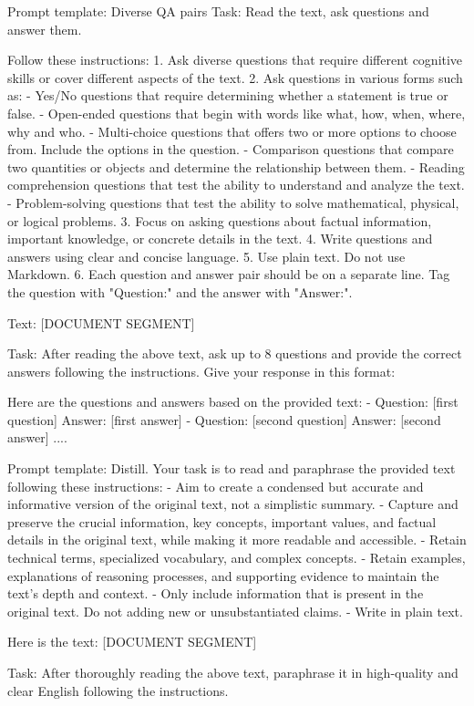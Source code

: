 \documentclass[11pt]{article}
\begin{document}
\begin{table}[!hbt]
\begin{prompt}{Prompt template: Diverse QA pairs}
Task: Read the text, ask questions and answer them.

Follow these instructions:
1. Ask diverse questions that require different cognitive skills or cover different aspects of the text.
2. Ask questions in various forms such as:
  - Yes/No questions that require determining whether a statement is true or false.
  - Open-ended questions that begin with words like what, how, when, where, why and who.
  - Multi-choice questions that offers two or more options to choose from. Include the options in the question.
  - Comparison questions that compare two quantities or objects and determine the relationship between them.
  - Reading comprehension questions that test the ability to understand and analyze the text.
  - Problem-solving questions that test the ability to solve mathematical, physical, or logical problems.
3. Focus on asking questions about factual information, important knowledge, or concrete details in the text.
4. Write questions and answers using clear and concise language.
5. Use plain text. Do not use Markdown.
6. Each question and answer pair should be on a separate line. Tag the question with "Question:" and the answer with "Answer:".

Text:
[DOCUMENT SEGMENT]

Task:
After reading the above text, ask up to 8 questions and provide the correct answers following the instructions. Give your response in this format:

Here are the questions and answers based on the provided text:
- Question: [first question] Answer: [first answer]
- Question: [second question] Answer: [second answer]
....
\end{prompt}
\end{table}


\begin{table}[!hbt]
\begin{prompt}{Prompt template: Distill.}
Your task is to read and paraphrase the provided text following these instructions:
- Aim to create a condensed but accurate and informative version of the original text, not a simplistic summary.
- Capture and preserve the crucial information, key concepts, important values, and factual details in the original text, while making it more readable and accessible.
- Retain technical terms, specialized vocabulary, and complex concepts.
- Retain examples, explanations of reasoning processes, and supporting evidence to maintain the text's depth and context.
- Only include information that is present in the original text. Do not adding new or unsubstantiated claims.
- Write in plain text.

Here is the text:
[DOCUMENT SEGMENT]

Task:
After thoroughly reading the above text, paraphrase it in high-quality and clear English following the instructions.
\end{prompt}
\end{table}
\end{document}
